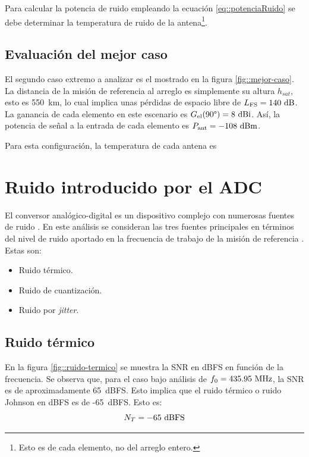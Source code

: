 \documentclass[../../main.tex]{subfiles}
\begin{document}
Para calcular la potencia de ruido empleando la ecuación \ref{eq::potenciaRuido} se debe determinar la temperatura de ruido de la antena\footnote{Esto es de cada elemento, no del arreglo entero.}.

\subsection{Evaluación del mejor caso}
El segundo caso extremo a analizar es el mostrado en la figura \ref{fig::mejor-caso}. La distancia de la misión de referencia al arreglo es simplemente su altura $h_{sat}$, esto es 550~km, lo cual implica unas pérdidas de espacio libre de $L_\textrm{FS} = 140~\textrm{dB}$. La ganancia de cada elemento en este escenario es $G_\textrm{el}(90\degree) = 8~\textrm{dBi}$. Así, la potencia de señal a la entrada de cada elemento es $P_\textrm{ant} = -108~\textrm{dBm}$.

Para esta configuración, la temperatura de cada antena es

\section{Ruido introducido por el ADC}
El conversor analógico-digital es un dispositivo complejo con numerosas fuentes de ruido \cite{ruidos-adc}. En este análisis se consideran las tres fuentes principales en términos del nivel de ruido aportado en la frecuencia de trabajo de la misión de referencia \cite{AD9249}. Estas son:
\begin{itemize}
    \item Ruido térmico.
    \item Ruido de cuantización.
    \item Ruido por \textit{jitter}.
\end{itemize}

\subsection{Ruido térmico}
En la figura \ref{fig::ruido-termico} se muestra la SNR en dBFS en función de la frecuencia. Se observa que, para el caso bajo análisis de $f_0 = 435.95~\textrm{MHz}$, la SNR es de aproximadamente 65~dBFS. Esto implica que el ruido térmico o ruido Johnson en dBFS es de -65~dBFS. Esto es:
\begin{equation}
    N_T = -65~\textrm{dBFS}
    \label{eq::ruido-termico}
\end{equation}
\end{document}
